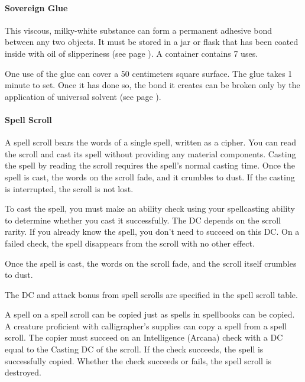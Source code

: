     \paragraph{Sovereign Glue} \label{item::sovereignglue}
        This viscous, milky-white substance can form a permanent adhesive bond between any two objects.
        It must be stored in a jar or flask that has been coated inside with oil of slipperiness (see page \pageref{item::oilofslipperiness}).
        A container contains 7 uses.

        One use of the glue can cover a 50 centimeters square surface.
        The glue takes 1 minute to set.
        Once it has done so, the bond it creates can be broken only by the application of universal solvent (see page \pageref{item::universalsolvent}).
    \paragraph{Spell Scroll} \label{item::spellscroll}
        A spell scroll bears the words of a single spell, written as a cipher.
        You can read the scroll and cast its spell without providing any material components.
        Casting the spell by reading the scroll requires the spell's normal casting time.
        Once the spell is cast, the words on the scroll fade, and it crumbles to dust.
        If the casting is interrupted, the scroll is not lost.

        To cast the spell, you must make an ability check using your spellcasting ability to determine whether you cast it successfully.
        The DC depends on the scroll rarity.
        If you already know the spell, you don't need to succeed on this DC.
        On a failed check, the spell disappears from the scroll with no other effect.

        Once the spell is cast, the words on the scroll fade, and the scroll itself crumbles to dust.

        The DC and attack bonus from spell scrolls are specified in the spell scroll table.

        A spell on a spell scroll can be copied just as spells in spellbooks can be copied.
        A creature proficient with calligrapher's supplies can copy a spell from a spell scroll.
        The copier must succeed on an Intelligence (Arcana) check with a DC equal to the Casting DC of the scroll.
        If the check succeeds, the spell is successfully copied.
        Whether the check succeeds or fails, the spell scroll is destroyed.


